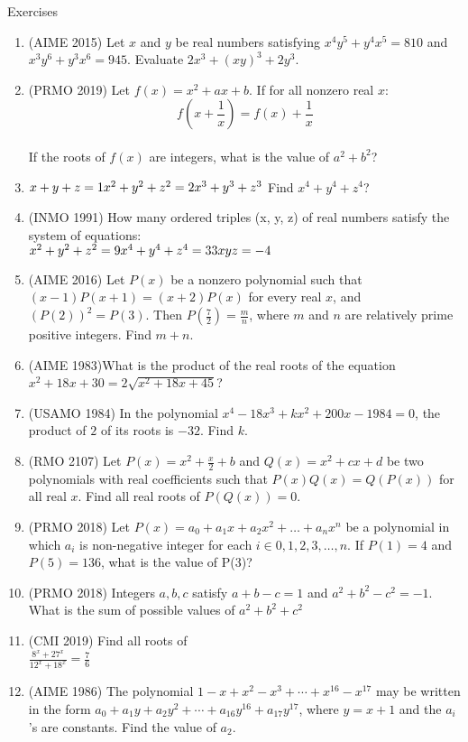 \begin{xcb}{Exercises}
\begin{enumerate}
\item (AIME 2015) Let $x$ and $y$ be real numbers satisfying $x^4y^5+y^4x^5=810$ and $x^3y^6+y^3x^6=945$. Evaluate $2x^3+(xy)^3+2y^3$.
\item (PRMO 2019) Let $f(x) = x^2 + ax + b$. If for all nonzero real $x$: \\
\[f(x+\frac{1}{x})=f(x)+\frac{1}{x}\]\\
If the roots of $f(x)$ are integers, what is the value of $a^2+b^2$?
\item $x+y+z=1\\
x^2+y^2+z^2=2\\
x^3+y^3+z^3\\$
Find $x^4+y^4+z^4$?
\item (INMO 1991) How many ordered triples (x, y, z) of real numbers satisfy the system of equations:\\
$x^2+y^2+z^2=9\\
x^4+y^4+z^4=33\\
xyz=-4$
\item (AIME 2016) Let $P(x)$ be a nonzero polynomial such that $(x-1)P(x+1)=(x+2)P(x)$ for every real $x$, and $\left(P(2)\right)^2 = P(3)$. Then $P(\tfrac72)=\tfrac{m}{n}$, where $m$ and $n$ are relatively prime positive integers. Find $m + n$.
\item (AIME 1983)What is the product of the real roots of the equation $x^2 + 18x + 30 = 2 \sqrt{x^2 + 18x + 45}$?
\item (USAMO 1984) In the polynomial $x^4 - 18x^3 + kx^2 + 200x - 1984 = 0$, the product of $2$ of its roots is $- 32$. Find $k$.
\item (RMO 2107) Let $P(x) = x^2 +\frac{x}{2}+b$ and $Q(x) = x^2 +cx+d$ be two polynomials with real coefficients such that $P(x)Q(x)=Q(P(x))$ for all real $x$. Find all real roots of $P(Q(x)) = 0$.
\item (PRMO 2018) Let $P(x) = a_0 + a_1x + a_2x^2 + \dots + a_nx^n$ be a polynomial in which $a_i$ is non-negative integer for each $i \in 0, 1, 2, 3, \dots, n$. If $P(1) = 4$ and $P(5) = 136$, what is the value of P(3)?
\item (PRMO 2018) Integers $a,b,c$ satisfy $a+b-c=1$ and $a^2+b^2-c^2=-1$. What is the sum of possible values of $a^2+b^2+c^2$
\item (CMI 2019) Find all roots of \\
$\frac{8^{x}+27^{x}}{12^{x}+18^{x}}=\frac{7}{6}$
\item (AIME 1986) The polynomial $1-x+x^2-x^3+\cdots+x^{16}-x^{17}$ may be written in the form $a_0+a_1y+a_2y^2+\cdots +a_{16}y^{16}+a_{17}y^{17}$, where $y=x+1$ and the $a_i$'s are constants. Find the value of $a_2$.
\end{enumerate}
\end{xcb}